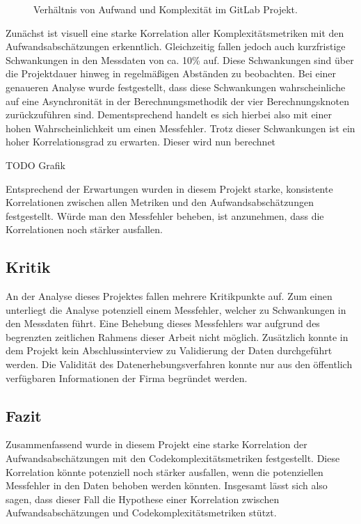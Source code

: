 \begin{figure}\label{gitlab-graph}
  \begin{center}
      
  \end{center}
  \caption{Verhältnis von Aufwand und Komplexität im GitLab Projekt.}
\end{figure}

Zunächst ist visuell eine starke Korrelation aller Komplexitätsmetriken
mit den Aufwandsabschätzungen erkenntlich. Gleichzeitig fallen jedoch
auch kurzfristige Schwankungen in den Messdaten von ca. 10\% auf. Diese
Schwankungen sind über die Projektdauer hinweg in regelmä\ss igen Abständen
zu beobachten. Bei einer genaueren Analyse wurde festgestellt, dass
diese Schwankungen wahrscheinliche auf eine Asynchronität in der
Berechnungsmethodik der vier Berechnungsknoten zurückzuführen sind.
Dementsprechend handelt es sich hierbei also mit einer hohen
Wahrscheinlichkeit um einen Messfehler. Trotz dieser Schwankungen ist
ein hoher Korrelationsgrad zu erwarten. Dieser wird nun berechnet

TODO Grafik

Entsprechend der Erwartungen wurden in diesem Projekt starke,
konsistente Korrelationen zwischen allen Metriken und den
Aufwandsabschätzungen festgestellt. Würde man den Messfehler beheben,
ist anzunehmen, dass die Korrelationen noch stärker ausfallen.

\subsection{Kritik}\label{gitlab-kritik}

An der Analyse dieses Projektes fallen mehrere Kritikpunkte auf. Zum
einen unterliegt die Analyse potenziell einem Messfehler, welcher zu
Schwankungen in den Messdaten führt. Eine Behebung dieses Messfehlers
war aufgrund des begrenzten zeitlichen Rahmens dieser Arbeit nicht
möglich. Zusätzlich konnte in dem Projekt kein Abschlussinterview zu
Validierung der Daten durchgeführt werden. Die Validität des
Datenerhebungsverfahren konnte nur aus den öffentlich verfügbaren
Informationen der Firma begründet werden.

\subsection{Fazit}\label{gitlab-Fazit}

Zusammenfassend wurde in diesem Projekt eine starke Korrelation der
Aufwandsabschätzungen mit den Codekomplexitätsmetriken festgestellt.
Diese Korrelation könnte potenziell noch stärker ausfallen, wenn die
potenziellen Messfehler in den Daten behoben werden könnten. Insgesamt
lässt sich also sagen, dass dieser Fall die Hypothese einer Korrelation
zwischen Aufwandsabschätzungen und Codekomplexitätsmetriken stützt.